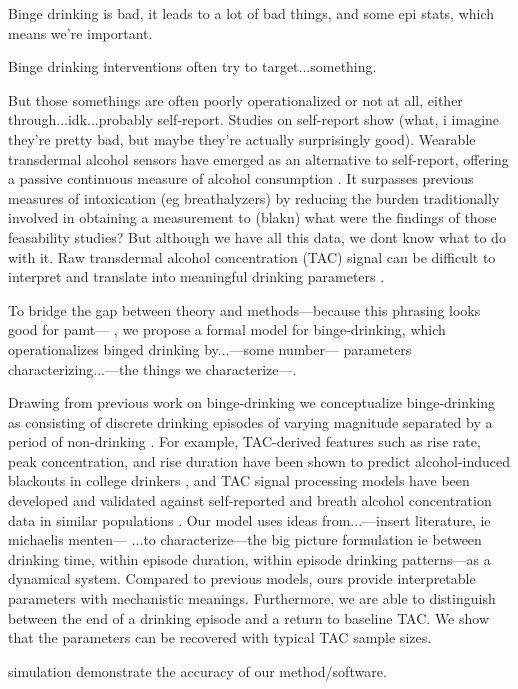 Binge drinking is bad, it leads to a lot of bad things, 
and some epi stats, which means we're important.

Binge drinking interventions often try to target...something.

But those somethings are often poorly operationalized or not at all, either through...idk...probably
self-report. Studies on self-report show
(what, i imagine they're pretty bad, but maybe they're actually surprisingly good). 
Wearable transdermal alcohol sensors have emerged as an alternative to self-report,
offering a passive continuous measure of alcohol consumption
\parencite{fairbairn2025,gunn2023}. It surpasses previous measures of intoxication (eg
breathalyzers) by reducing the burden traditionally involved in obtaining a measurement to (blakn)
 what were the findings of those feasability studies?  
But although we have all this data, we dont know what to do with it.
Raw transdermal alcohol concentration (TAC) signal
can be difficult to interpret and translate into meaningful drinking parameters
\parencite{gunn2023,kianersi2023}.

To bridge the gap between theory and methods---because this phrasing looks good for pamt---
, we propose a formal model for binge-drinking, which operationalizes
binged drinking by...---some number--- parameters characterizing...---the things we
characterize---. 

Drawing from previous work on binge-drinking we conceptualize
binge-drinking as consisting of discrete drinking episodes of varying magnitude
separated by a period of non-drinking \parencite{greenfield2000}.
For example, TAC-derived features such as rise rate, peak concentration, and rise duration
have been shown to predict alcohol-induced blackouts in college drinkers
\parencite{richards2024}, and TAC signal processing models have been developed and validated
against self-reported and breath alcohol concentration data in similar populations
\parencite{kianersi2023}.
Our model uses ideas from...---insert literature, ie michaelis menten---
...to characterize---the big picture formulation ie between drinking time, within episode
duration, within episode drinking patterns---as a dynamical system. 
Compared to previous models, ours provide interpretable parameters with mechanistic meanings.
Furthermore, we are able to distinguish between the end of a drinking episode and 
a return to baseline TAC. We show that the parameters can be recovered with typical
TAC sample sizes.

simulation demonstrate the accuracy of our method/software.

